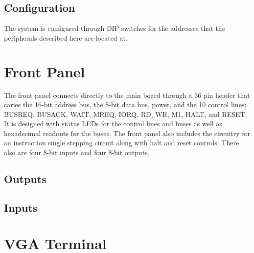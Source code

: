\documentclass{book}
\begin{document}
\section{Configuration}
The system is configured through DIP switches for the addresses that the peripherals described here are located at.

\chapter{Front Panel}
The front panel connects directly to the main board through a 36 pin header that caries the 16-bit address bus, the 8-bit data bus, power, and the 10 control lines; BUSREQ, BUSACK, WAIT, MREQ, IORQ, RD, WR, M1, HALT, and RESET. It is designed with status LEDs for the control lines and buses as well as hexadecimal readouts for the buses. The front panel also includes the circuitry for an instruction single stepping circuit along with halt and reset controls. There also are four 8-bit inputs and four 8-bit outputs.
\section{Outputs}
\section{Inputs}

\chapter{VGA Terminal}
\end{document}
